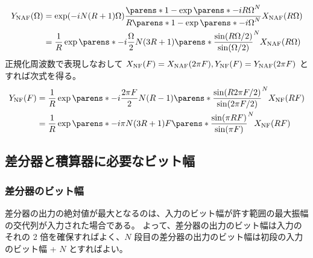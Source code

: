         \begin{align*}
            \YNAF(\Omega) &= \exp(-iN(R+1)\Omega)\frac{\parens*{1-\exp\parens*{-iR\Omega}}^N}{R\parens*{1-\exp\parens*{-i\Omega}}^N}\XNAF(R\Omega) \\
            &= \frac{1}{R}\exp\parens*{-i\frac{\Omega}{2}N(3R+1)}\parens*{\frac{\sin(R\Omega/2)}{\sin(\Omega/2)}}^N \XNAF(R\Omega)
        \end{align*}
        正規化周波数で表現しなおして $X_\text{NF}(F) = X_\text{NAF}(2\pi F), Y_\text{NF}(F) = Y_\text{NAF}(2\pi F)$ とすれば次式を得る。
        \begin{align}
            \YNF(F) &= \frac{1}{R}\exp\parens*{-i\frac{2\pi F}{2}N(R-1)}\parens*{\frac{\sin(R 2\pi F/2)}{\sin(2\pi F/2)}}^N \XNF(R F) \nonumber \\
            &= \frac{1}{R}\exp\parens*{-i\pi N(3R+1)F}\parens*{\frac{\sin(\pi R F)}{\sin(\pi F)}}^N \XNF(R F) \label{equation:CIC up-sampler の周波数特性}
        \end{align}
    \subsection{差分器と積算器に必要なビット幅}
        \subsubsection{差分器のビット幅}
            差分器の出力の絶対値が最大となるのは、入力のビット幅が許す範囲の最大振幅の交代列が入力された場合である。
            よって、差分器の出力のビット幅は入力のそれの 2 倍を確保すればよく、$N$ 段目の差分器の出力のビット幅は初段の入力のビット幅 + $N$ とすればよい。
